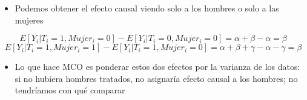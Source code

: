\documentclass[
  ignorenonframetext,
]{beamer}
\providecommand{\tightlist}{%
  \setlength{\itemsep}{0pt}\setlength{\parskip}{0pt}}
\begin{document}
\begin{frame}{}
\protect\hypertarget{section-37}{}
\begin{itemize}
\tightlist
\item
  Podemos obtener el efecto causal viendo solo a los hombres o solo a
  las mujeres
\end{itemize}

\[E[Y_i| T_i=1, Mujer_i=0]-E[Y_i| T_{i}=0, Mujer_i=0]=\alpha+\beta-\alpha=\beta\]
\[E[Y_i| T_i=1, Mujer_i=1]-E[Y_i| T_{i}=1, Mujer_i=0]=\alpha+\beta+ \gamma-\alpha-\gamma=\beta\]

\begin{itemize}
\tightlist
\item
  Lo que hace MCO es ponderar estos dos efectos por la varianza de los
  datos: si no hubiera hombres tratados, no asignaría efecto causal a
  los hombres; no tendríamos con qué comparar
\end{itemize}
\end{frame}
\end{document}
